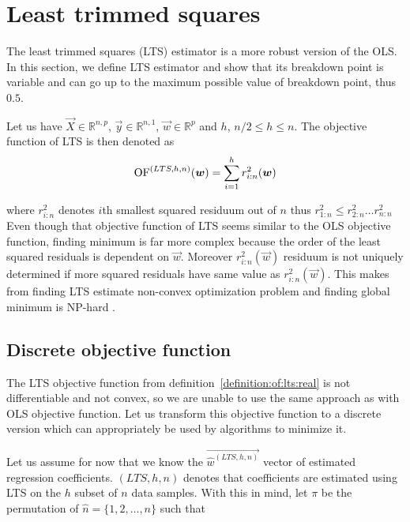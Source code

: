 \section{Least trimmed squares}
The least trimmed squares (LTS) estimator is a more robust version of the OLS. In this section, we define LTS estimator and show that its breakdown point is variable and can go up to the maximum possible value of breakdown point, thus~$0.5$.

\begin{definition} \label{definition:of:lts:real}
Let us have $\vec{X} \in \mathbb{R}^{n,p}$, $\vec{y} \in \mathbb{R}^{n,1}$, 
    $\vec{w} \in \mathbb{R}^p$ and $h$, $ n/2 \leq h \leq n$. The objective function of LTS is then denoted as 
    \begin{equation}  
        \operatorname{OF}^{(LTS,h, n)}(\boldsymbol{w}) =  \sum\limits_{i=1}^h r_{i:n}^2(\boldsymbol{w})  
    \end{equation}
\end{definition}
where $r_{i:n}^2$ denotes $i$th smallest squared residuum out of $n$ thus $r_{1:n}^2 \leq r_{2:n}^2 \ldots r_{n:n}^2$
Even though that objective function of LTS seems similar to the OLS objective function, finding minimum is far more complex because the order of the least squared residuals is dependent on $\vec{w}$. Moreover  $r_{i:n}^2(\vec{w})$ residuum is not uniquely determined if more squared residuals have same value as $r_{i:n}^2(\vec{w})$. This makes from finding LTS estimate non-convex optimization problem and finding global minimum is NP-hard \cite{bernholt2006robust}. 

\subsection{Discrete objective function} \label{sectionofltsdiscrete}
The LTS objective function from definition~\ref{definition:of:lts:real} is not differentiable and not convex, so we are unable to use the same approach as with OLS objective function. Let us transform this objective function to a discrete version which can appropriately be used by algorithms to minimize it.

Let us assume for now that we know the $\vec{\hat{w}^{(LTS, h, n)}}$ vector of estimated regression coefficients. $(LTS, h, n)$ denotes that coefficients are estimated using LTS on the $h$ subset of $n$ data samples. 
With this in mind, let $\pi$ be the permutation of $\hat{n} = \{{1,2,\ldots, n\}}$ such that 

